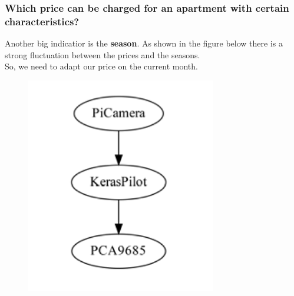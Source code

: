 \documentclass{beamer}
\begin{document}
\begin{frame}
\frametitle{Which price can be charged for an apartment with certain characteristics?}
Another big indicatior is the \textbf{season}. As shown in the figure below there is a strong fluctuation between the prices and the seasons.\\ So, we need to adapt our price on the current month.
\begin{figure}
\includegraphics[width=0.8\linewidth]{photo/autonom}
\end{figure}
\end{frame}
\end{document}
